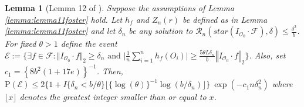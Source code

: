 \documentclass[twoside,11pt]{article}
\newtheorem{lemma}{Lemma}
\newcommand{\mc}{\mathcal}
\begin{document}
\begin{lemma}[Lemma 12 of \cite{foster2023orthogonal}]
     Suppose the assumptions of Lemma \ref{lemma:lemma11foster} hold. Let $h_f$ and $Z_n(r) $ be defined as in Lemma \ref{lemma:lemma11foster} and let $\delta_n$ be any solution to $\mc{R}_n\left(star\left(I_{\mc{O}_0}\cdot\mc{F}\right),\delta\right)\le\frac{\delta^2}{b}$. For fixed $\theta>1$ define the event $\mc{E}:=\{\exists f\in\mc{F}:\Vert I_{\mc{O}_0}\cdot f\Vert_2\ge\delta_n\text{ and } \big\vert\frac{1}{n}\sum_{i=1}^nh_f(O_i) \big\vert\ge \frac{5\theta L\delta_n}{b}\left\Vert I_{\mc{O}_0}\cdot f\right\Vert_2\}$. Also, set $c_1=\left\{8b^2(1+17e)\right\}^{-1}$. Then, $\text{P}(\mathcal{E})\le2\{ 1+I\{\delta_n<b/\theta\}\lfloor\{\log(\theta)\}^{-1}\log(b/\delta_n)\rfloor\} \:\exp(-c_1n\delta_n^2)$ where $\lfloor x \rfloor$ denotes the greatest integer smaller than or equal to $x$.
     \label{lemma:lemma12foster}
\end{lemma}
\end{document}

